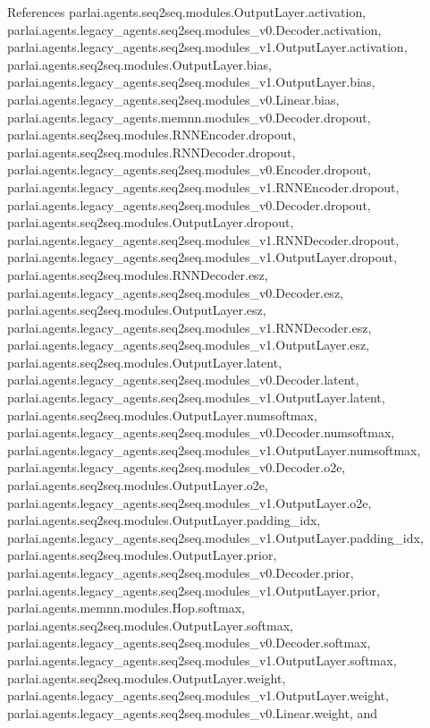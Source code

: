 References parlai.\+agents.\+seq2seq.\+modules.\+Output\+Layer.\+activation, parlai.\+agents.\+legacy\+\_\+agents.\+seq2seq.\+modules\+\_\+v0.\+Decoder.\+activation, parlai.\+agents.\+legacy\+\_\+agents.\+seq2seq.\+modules\+\_\+v1.\+Output\+Layer.\+activation, parlai.\+agents.\+seq2seq.\+modules.\+Output\+Layer.\+bias, parlai.\+agents.\+legacy\+\_\+agents.\+seq2seq.\+modules\+\_\+v1.\+Output\+Layer.\+bias, parlai.\+agents.\+legacy\+\_\+agents.\+seq2seq.\+modules\+\_\+v0.\+Linear.\+bias, parlai.\+agents.\+legacy\+\_\+agents.\+memnn.\+modules\+\_\+v0.\+Decoder.\+dropout, parlai.\+agents.\+seq2seq.\+modules.\+R\+N\+N\+Encoder.\+dropout, parlai.\+agents.\+seq2seq.\+modules.\+R\+N\+N\+Decoder.\+dropout, parlai.\+agents.\+legacy\+\_\+agents.\+seq2seq.\+modules\+\_\+v0.\+Encoder.\+dropout, parlai.\+agents.\+legacy\+\_\+agents.\+seq2seq.\+modules\+\_\+v1.\+R\+N\+N\+Encoder.\+dropout, parlai.\+agents.\+legacy\+\_\+agents.\+seq2seq.\+modules\+\_\+v0.\+Decoder.\+dropout, parlai.\+agents.\+seq2seq.\+modules.\+Output\+Layer.\+dropout, parlai.\+agents.\+legacy\+\_\+agents.\+seq2seq.\+modules\+\_\+v1.\+R\+N\+N\+Decoder.\+dropout, parlai.\+agents.\+legacy\+\_\+agents.\+seq2seq.\+modules\+\_\+v1.\+Output\+Layer.\+dropout, parlai.\+agents.\+seq2seq.\+modules.\+R\+N\+N\+Decoder.\+esz, parlai.\+agents.\+legacy\+\_\+agents.\+seq2seq.\+modules\+\_\+v0.\+Decoder.\+esz, parlai.\+agents.\+seq2seq.\+modules.\+Output\+Layer.\+esz, parlai.\+agents.\+legacy\+\_\+agents.\+seq2seq.\+modules\+\_\+v1.\+R\+N\+N\+Decoder.\+esz, parlai.\+agents.\+legacy\+\_\+agents.\+seq2seq.\+modules\+\_\+v1.\+Output\+Layer.\+esz, parlai.\+agents.\+seq2seq.\+modules.\+Output\+Layer.\+latent, parlai.\+agents.\+legacy\+\_\+agents.\+seq2seq.\+modules\+\_\+v0.\+Decoder.\+latent, parlai.\+agents.\+legacy\+\_\+agents.\+seq2seq.\+modules\+\_\+v1.\+Output\+Layer.\+latent, parlai.\+agents.\+seq2seq.\+modules.\+Output\+Layer.\+numsoftmax, parlai.\+agents.\+legacy\+\_\+agents.\+seq2seq.\+modules\+\_\+v0.\+Decoder.\+numsoftmax, parlai.\+agents.\+legacy\+\_\+agents.\+seq2seq.\+modules\+\_\+v1.\+Output\+Layer.\+numsoftmax, parlai.\+agents.\+legacy\+\_\+agents.\+seq2seq.\+modules\+\_\+v0.\+Decoder.\+o2e, parlai.\+agents.\+seq2seq.\+modules.\+Output\+Layer.\+o2e, parlai.\+agents.\+legacy\+\_\+agents.\+seq2seq.\+modules\+\_\+v1.\+Output\+Layer.\+o2e, parlai.\+agents.\+seq2seq.\+modules.\+Output\+Layer.\+padding\+\_\+idx, parlai.\+agents.\+legacy\+\_\+agents.\+seq2seq.\+modules\+\_\+v1.\+Output\+Layer.\+padding\+\_\+idx, parlai.\+agents.\+seq2seq.\+modules.\+Output\+Layer.\+prior, parlai.\+agents.\+legacy\+\_\+agents.\+seq2seq.\+modules\+\_\+v0.\+Decoder.\+prior, parlai.\+agents.\+legacy\+\_\+agents.\+seq2seq.\+modules\+\_\+v1.\+Output\+Layer.\+prior, parlai.\+agents.\+memnn.\+modules.\+Hop.\+softmax, parlai.\+agents.\+seq2seq.\+modules.\+Output\+Layer.\+softmax, parlai.\+agents.\+legacy\+\_\+agents.\+seq2seq.\+modules\+\_\+v0.\+Decoder.\+softmax, parlai.\+agents.\+legacy\+\_\+agents.\+seq2seq.\+modules\+\_\+v1.\+Output\+Layer.\+softmax, parlai.\+agents.\+seq2seq.\+modules.\+Output\+Layer.\+weight, parlai.\+agents.\+legacy\+\_\+agents.\+seq2seq.\+modules\+\_\+v1.\+Output\+Layer.\+weight, parlai.\+agents.\+legacy\+\_\+agents.\+seq2seq.\+modules\+\_\+v0.\+Linear.\+weight, and 